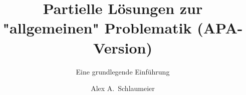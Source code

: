 \documentclass[type=master,degree=engineering,theme=default,language=german,titlelanguage=german,smartquotes=true,apa=true,aiusage=detailed]{hgbthesis}
\begin{document}


\title{Partielle Lösungen zur "allgemeinen" Problematik (APA-Version)}
\subtitle{Eine grundlegende Einführung}
\author{Alex A.\ Schlaumeier}







\frontmatter                                       %

\maketitle
\tableofcontents

		
			

\mainmatter                             %









\end{document}
